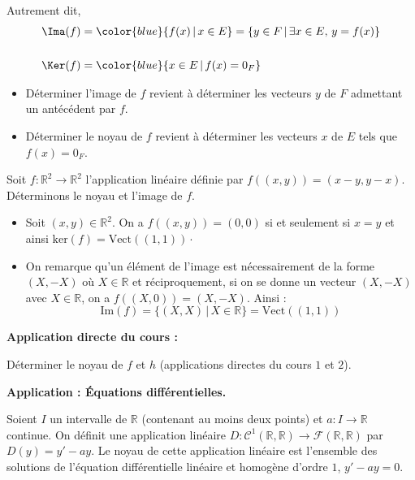 \documentclass[french,11pt,twoside]{VcCours}
\newenvironment{ApplicationDirecte}{\textbf{Application directe du cours :}

}{}
\renewcommand{\trou}[1]{{\color{blue}#1}}
\begin{document}
 Autrement dit,
 \begin{align*}
	\Ima(f)&= \trou{\lbrace f(x) \, \vert \, x \in E \rbrace = \lbrace y \in F \, \vert \, \exists x \in E, \, y=f(x) \rbrace}\\\\
	\Ker(f)&= \trou{\lbrace x \in E \, \vert \,  f(x)= 0_F \rbrace}
 \end{align*}


 \begin{Remarques}{}
\begin{itemize} 
 \item Déterminer l'image de $f$ revient à déterminer les vecteurs $y$ de $F$ admettant un antécédent par $f$.
 \item Déterminer le noyau de $f$ revient à déterminer les vecteurs $x$ de $E$ tels que $f(x)= 0_F$.
 \end{itemize}
\end{Remarques}{}
 
\begin{Exemple}
	Soit $f : \mathbb{R}^2 \rightarrow \mathbb{R}^2$ l'application linéaire définie par $f((x,y))=(x-y,y-x)$. Déterminons le noyau et l'image de $f$.
 
\trou{
\begin{itemize}
\item Soit $(x,y) \in \mathbb{R}^2$. On a $f((x,y))=(0,0)$ si et seulement si $x=y$ et ainsi $\textrm{ker}(f) = \textrm{Vect}((1,1)) \cdot$
\item On remarque qu'un élément de l'image est nécessairement de la forme $(X,-X)$ où $X \in \mathbb{R}$ et réciproquement, si on se donne un vecteur $(X,-X)$ avec $X \in \mathbb{R}$, on a $f((X,0))=(X,-X)$. Ainsi :
$$ \textrm{Im}(f) = \lbrace (X,X) \, \vert \, X \in \mathbb{R} \rbrace =  \textrm{Vect}((1,1))$$
\end{itemize}
}

\end{Exemple}

\begin{ApplicationDirecte} 
	Déterminer le noyau de $f$ et $h$ (applications directes du cours $1$ et $2$).
\end{ApplicationDirecte}

\medskip
\textbf{Application : Équations différentielles.}

Soient $I$ un intervalle de $\mathbb{R}$ (contenant au moins deux points) et $a : I \rightarrow \mathbb{R}$ continue. On définit une application linéaire $D : \mathcal{C}^1(\mathbb{R}, \mathbb{R}) \rightarrow \mathcal{F}(\mathbb{R}, \mathbb{R})$ par $D(y)=y'-ay$. Le noyau de cette application linéaire est l'ensemble des solutions de l'équation différentielle linéaire et homogène d'ordre $1$, $y'-ay=0$.
\end{document}

